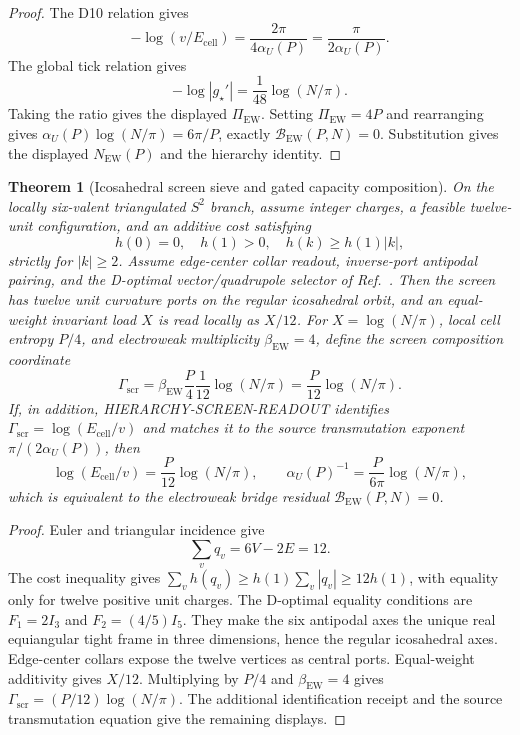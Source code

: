 \documentclass[11pt]{article}
\newtheorem{theorem}{Theorem}[section]
\begin{document}
\begin{proof}
The D10 relation gives
\[
-\log(v/E_{\mathrm{cell}})=\frac{2\pi}{4\alpha_U(P)}=\frac{\pi}{2\alpha_U(P)}.
\]
The global tick relation gives
\[
-\log|g_\star'|=\frac{1}{48}\log(N/\pi).
\]
Taking the ratio gives the displayed \(\Pi_{\mathrm{EW}}\). Setting
\(\Pi_{\mathrm{EW}}=4P\) and rearranging gives
\(\alpha_U(P)\log(N/\pi)=6\pi/P\), exactly
\(\mathcal B_{\mathrm{EW}}(P,N)=0\). Substitution gives the displayed
\(N_{\mathrm{EW}}(P)\) and the hierarchy identity.
\end{proof}

\begin{theorem}[Icosahedral screen sieve and gated capacity composition]\label{thm:screen-sieve-capacity-projection}
On the locally six-valent triangulated \(S^2\) branch, assume integer charges,
a feasible twelve-unit configuration, and an additive cost satisfying
\[
 h(0)=0,\quad h(1)>0,\quad h(k)\ge h(1)|k|,
\]
strictly for \(|k|\ge2\). Assume edge-center collar readout, inverse-port
antipodal pairing, and the D-optimal vector/quadrupole selector of
Ref.~\cite{ophmicrophysics}. Then the screen has twelve unit curvature ports on
the regular icosahedral orbit, and an equal-weight invariant load \(X\) is read
locally as \(X/12\). For
\(X=\log(N/\pi)\), local cell entropy \(P/4\), and electroweak multiplicity
\(\beta_{\mathrm{EW}}=4\), define the screen composition coordinate
\[
\Gamma_{\mathrm{scr}}
=
\beta_{\mathrm{EW}}\frac{P}{4}\frac{1}{12}\log(N/\pi)
=
\frac{P}{12}\log(N/\pi).
\]
If, in addition, \textsc{HIERARCHY-SCREEN-READOUT} identifies
\(\Gamma_{\mathrm{scr}}=\log(E_{\mathrm{cell}}/v)\) and matches it to the
source transmutation exponent \(\pi/(2\alpha_U(P))\), then
\[
\log(E_{\mathrm{cell}}/v)
=\frac{P}{12}\log(N/\pi),
\qquad
\alpha_U(P)^{-1}=\frac{P}{6\pi}\log(N/\pi),
\]
which is equivalent to the electroweak bridge residual
\(\mathcal B_{\mathrm{EW}}(P,N)=0\).
\end{theorem}

\begin{proof}
Euler and triangular incidence give
\[
\sum_v q_v=6V-2E=12.
\]
The cost inequality gives
\(\sum_vh(q_v)\ge h(1)\sum_v|q_v|\ge12h(1)\), with equality only for twelve
positive unit charges. The D-optimal equality conditions are
\(F_1=2I_3\) and \(F_2=(4/5)I_5\). They make the six antipodal axes the unique
real equiangular tight frame in three dimensions, hence the regular
icosahedral axes. Edge-center collars expose the twelve vertices as central
ports. Equal-weight additivity gives \(X/12\). Multiplying by \(P/4\) and
\(\beta_{\mathrm{EW}}=4\) gives
\(\Gamma_{\mathrm{scr}}=(P/12)\log(N/\pi)\). The additional identification
receipt and the source transmutation equation give the remaining displays.
\end{proof}
\end{document}
